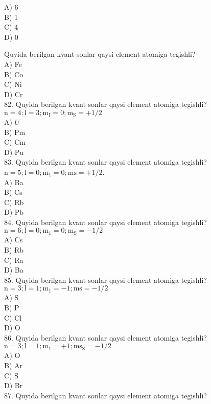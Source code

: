 A) 6\\
B) 1\\
C) 4\\
D) 0
  \item Quyida berilgan kvant sonlar qaysi element atomiga tegishli?\\
A) Fe\\
B) Co\\
C) Ni\\
D) Cr\\
82. Quyida berilgan kvant sonlar qaysi element atomiga tegishli?\\
$\mathrm{n}=4 ; \mathrm{l}=3 ; \mathrm{m}_{\mathrm{I}}=0 ; \mathrm{m}_{\mathrm{S}}=+1 / 2$\\
A) $U$\\
B) Pm\\
C) Cm\\
D) Pu\\
83. Quyida berilgan kvant sonlar qaysi element atomiga tegishli?\\
$\mathrm{n}=5 ; \mathrm{l}=0 ; \mathrm{m}_{1}=0 ; \mathrm{ms}=+1 / 2$.\\
A) Ba\\
B) Cs\\
C) Rb\\
D) Pb\\
84. Quyida berilgan kvant sonlar qaysi element atomiga tegishli?\\
$\mathrm{n}=6 ; \mathrm{l}=0 ; \mathrm{m}_{1}=0 ; \mathrm{m}_{\mathrm{S}}=-1 / 2$\\
A) Cs\\
B) Rb\\
C) Ra\\
D) Ba\\
85. Quyida berilgan kvant sonlar qaysi element atomiga tegishli?\\
$\mathrm{n}=3 ; \mathrm{l}=1 ; \mathrm{m}_{1}=-1 ; \mathrm{ms}=-1 / 2$\\
A) S\\
B) P\\
C) Cl\\
D) O\\
86. Quyida berilgan kvant sonlar qaysi element atomiga tegishli?\\
$\mathrm{n}=3 ; \mathrm{l}=1 ; \mathrm{m}_{1}=+1 ; \mathrm{ms}_{\mathrm{S}}=-1 / 2$\\
A) O\\
B) Ar\\
C) S\\
D) Br\\
87. Quyida berilgan kvant sonlar qaysi element atomiga tegishli?\\
